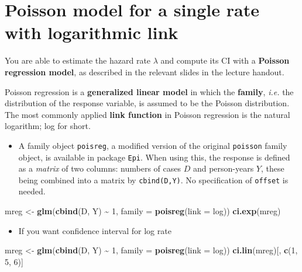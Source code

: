 \documentclass[
]{book}
\newenvironment{Shaded}{\begin{snugshade}}{\end{snugshade}}
\newcommand{\AttributeTok}[1]{\textcolor[rgb]{0.13,0.29,0.53}{#1}}
\newcommand{\DecValTok}[1]{\textcolor[rgb]{0.00,0.00,0.81}{#1}}
\newcommand{\FunctionTok}[1]{\textcolor[rgb]{0.13,0.29,0.53}{\textbf{#1}}}
\newcommand{\NormalTok}[1]{#1}
\newcommand{\OtherTok}[1]{\textcolor[rgb]{0.56,0.35,0.01}{#1}}
\newcommand{\SpecialCharTok}[1]{\textcolor[rgb]{0.81,0.36,0.00}{\textbf{#1}}}
\providecommand{\tightlist}{%
  \setlength{\itemsep}{0pt}\setlength{\parskip}{0pt}}
\begin{document}
\section{Poisson model for a single rate with logarithmic link}\label{poisson-model-for-a-single-rate-with-logarithmic-link}

You are able to estimate the hazard rate \(\lambda\) and compute its CI with a \textbf{Poisson regression model}, as described in the relevant slides in the lecture handout.

Poisson regression is a \textbf{generalized linear model} in which the \textbf{family}, \emph{i.e.} the distribution of the response variable, is assumed to be the Poisson distribution. The most commonly applied \textbf{link function}
in Poisson regression is the natural logarithm; log for short.

\begin{itemize}
\tightlist
\item
  A family object \texttt{poisreg}, a modified version of the original \texttt{poisson} family object, is available
  in package \texttt{Epi}. When using this, the response is defined as a \emph{matrix} of two columns: numbers
  of cases \(D\) and person-years \(Y\), these being combined into a matrix by \texttt{cbind(D,Y)}. No specification
  of \texttt{offset} is needed.
\end{itemize}

\begin{Shaded}
\begin{Highlighting}[]
\NormalTok{mreg }\OtherTok{\textless{}{-}} \FunctionTok{glm}\NormalTok{(}\FunctionTok{cbind}\NormalTok{(D, Y) }\SpecialCharTok{\textasciitilde{}} \DecValTok{1}\NormalTok{, }\AttributeTok{family =} \FunctionTok{poisreg}\NormalTok{(}\AttributeTok{link =}\NormalTok{ log))}
\FunctionTok{ci.exp}\NormalTok{(mreg)}
\end{Highlighting}
\end{Shaded}

\begin{itemize}
\tightlist
\item
  If you want confidence interval for log rate
\end{itemize}

\begin{Shaded}
\begin{Highlighting}[]
\NormalTok{mreg }\OtherTok{\textless{}{-}} \FunctionTok{glm}\NormalTok{(}\FunctionTok{cbind}\NormalTok{(D, Y) }\SpecialCharTok{\textasciitilde{}} \DecValTok{1}\NormalTok{, }\AttributeTok{family =} \FunctionTok{poisreg}\NormalTok{(}\AttributeTok{link =}\NormalTok{ log))}
\FunctionTok{ci.lin}\NormalTok{(mreg)[, }\FunctionTok{c}\NormalTok{(}\DecValTok{1}\NormalTok{, }\DecValTok{5}\NormalTok{, }\DecValTok{6}\NormalTok{)]}
\end{Highlighting}
\end{Shaded}
\end{document}
